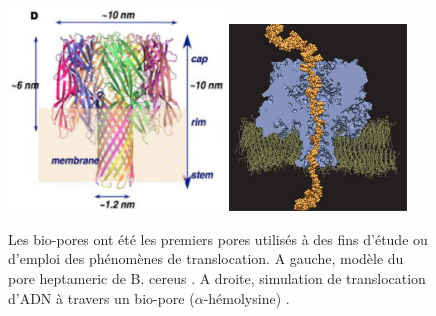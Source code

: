 \begin{figure}[H]
\begin{center}
\includegraphics[width=0.51\textwidth]{bioporetoxine.png}
\includegraphics[width=0.42\textwidth]{biopore2.jpg}

\caption[Biopores]{Les bio-pores ont été les premiers pores utilisés à des fins d'étude ou d'emploi des phénomènes de translocation. A gauche, modèle du pore heptameric de B. cereus \cite{Ramarao2013}. A droite, simulation de translocation d'ADN à travers un bio-pore ($\alpha$-hémolysine) \cite{Aksimentiev2010}.}
\label{biopore}
\end{center}
\end{figure}


